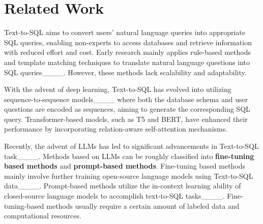 \section{Related Work}
Text-to-SQL aims to convert users' natural language queries into appropriate SQL queries, enabling non-experts to access databases and retrieve information with reduced effort and cost. Early research mainly applies rule-based methods and template matching techniques to translate natural language questions into SQL queries____. However, these methods lack scalability and adaptability.

 With the advent of deep learning, Text-to-SQL has evolved into utilizing sequence-to-sequence models____ where both the database schema and user questions are encoded as sequences, aiming to generate the corresponding SQL query. Transformer-based models, such as T5 and BERT, have enhanced their performance by incorporating relation-aware self-attention mechanisms.

Recently, the advent of LLMs has led to significant advancements in Text-to-SQL task____. 
Methods based on LLMs can be roughly classified into \textbf{fine-tuning based methods} and \textbf{prompt-based methods}.
Fine-tuning based methods mainly involve further training open-source language models using Text-to-SQL data____. 
Prompt-based methods utilize the in-context learning ability of closed-source language models to accomplish text-to-SQL tasks____.
Fine-tuning-based methods usually require a certain amount of labeled data and computational resources.

